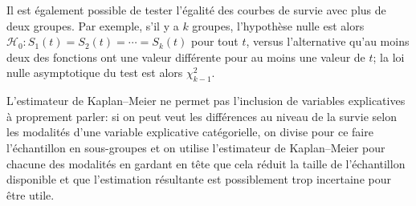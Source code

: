 \documentclass[
  11pt,
  letterpaper,
]{scrbook}
\theoremstyle{definition}
\theoremstyle{remark}
\begin{document}
Il est également possible de tester l'égalité des courbes de survie avec
plus de deux groupes. Par exemple, s'il y a \(k\) groupes, l'hypothèse
nulle est alors \(\mathscr{H}_0: S_1(t)=S_2(t)=\cdots = S_k(t)\) pour
tout \(t\), versus l'alternative qu'au moins deux des fonctions ont une
valeur différente pour au moins une valeur de \(t\); la loi nulle
asymptotique du test est alors \(\chi^2_{k-1}\).

L'estimateur de Kaplan--Meier ne permet pas l'inclusion de variables
explicatives à proprement parler: si on peut veut les différences au
niveau de la survie selon les modalités d'une variable explicative
catégorielle, on divise pour ce faire l'échantillon en sous-groupes et
on utilise l'estimateur de Kaplan--Meier pour chacune des modalités en
gardant en tête que cela réduit la taille de l'échantillon disponible et
que l'estimation résultante est possiblement trop incertaine pour être
utile.
\end{document}
